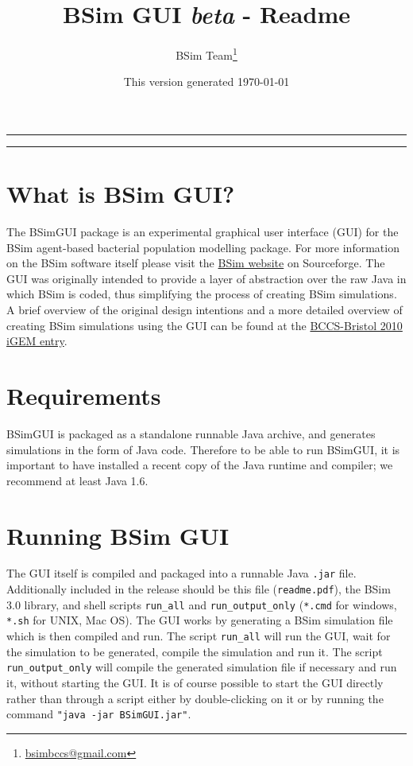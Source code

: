 \documentclass[a4paper,10pt]{article}
\title{BSim GUI \emph{beta} - Readme}
\author{BSim Team\footnote{\href{mailto:bsimbccs@gmail.com}{bsimbccs@gmail.com}}}
\date{This version generated \today}
\begin{document}
\maketitle
\rule{0.9\textwidth}{0.5pt}
\tableofcontents
\vspace{1em}
\rule{0.9\textwidth}{0.5pt}

\section{What is BSim GUI?}
The BSimGUI package is an experimental graphical user interface (GUI) for the BSim agent-based bacterial population modelling package.
For more information on the BSim software itself please visit the \href{http://bsim-bccs.sourceforge.net/}{BSim website} on Sourceforge.
The GUI was originally intended to provide a layer of abstraction over the raw Java in which BSim is coded, thus simplifying the process of creating BSim simulations.
A brief overview of the original design intentions and a more detailed overview of creating BSim simulations using the GUI can be found at the \href{http://2010.igem.org/Team:BCCS-Bristol/Modelling/BSIM/GUI}{BCCS-Bristol 2010 iGEM entry}.

\section{Requirements}
BSimGUI is packaged as a standalone runnable Java archive, and generates simulations in the form of Java code.
Therefore to be able to run BSimGUI, it is important to have installed a recent copy of the Java runtime and compiler; we recommend at least Java 1.6.

\section{Running BSim GUI}
The GUI itself is compiled and packaged into a runnable Java \texttt{.jar} file.
Additionally included in the release should be this file (\texttt{readme.pdf}), the BSim 3.0 library, and shell scripts \texttt{run\_all} and \texttt{run\_output\_only} (\texttt{*.cmd} for windows, \texttt{*.sh} for UNIX, Mac OS).
The GUI works by generating a BSim simulation file which is then compiled and run.
The script \texttt{run\_all} will run the GUI, wait for the simulation to be generated, compile the simulation and run it.
The script \texttt{run\_output\_only} will compile the generated simulation file if necessary and run it, without starting the GUI.
It is of course possible to start the GUI directly rather than through a script either by double-clicking on it or by running the command \texttt{"java -jar BSimGUI.jar"}.
\end{document}
